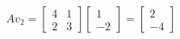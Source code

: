 \documentclass{article}
\begin{document}
\begin{align*}
Av_2 = \begin{bmatrix}4&1\\2&3\end{bmatrix}\begin{bmatrix}1\\-2\end{bmatrix}= \begin{bmatrix}2\\-4\end{bmatrix}
\end{align*}
\end{document}
